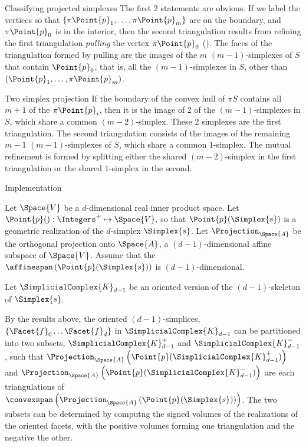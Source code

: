 \begin{plSection}{Classifying projected simplexes}
The first 2 statements are obvious.
If we label the vertices so that $\left\{\pi \Point{p}_1, \ldots , \pi \Point{p}_m\right\}$
are on the boundary, and $\pi \Point{p}_0$ is in the interior,
then the second triangulation results from refining the first
triangulation {\it pulling} the vertex $\pi \Point{p}_0$
().
The faces of the triangulation formed by pulling
are the images of the $m$ $(m-1)$-simplexes
of $S$ that contain $\Point{p}_0$, that is, all the $(m-1)$-simplexes in $S$,
other than $(\Point{p}_1, \ldots , \pi \Point{p}_m)$.

\begin{plTheorem}{Two simplex projection}{}
\label{two-simplex-case}
If the boundary of the convex hull of $\pi S$
contains all $m+1$ of the $\pi \Point{p}_i$,
then it is the image of 2 of the $(m-1)$-simplexes in $S$,
which share a common $(m-2)$-simplex.
These 2 simplexes are the first triangulation.
The second triangulation consists of the images
of the remaining $m-1$ $(m-1)$-simplexes of $S$,
which share a common $1$-simplex.
The mutual refinement is formed by splitting either
the shared $(m-2)$-simplex in the first triangulation
or the shared $1$-simplex in the second.
\end{plTheorem}

\begin{plSection}{Implementation}

Let $\Space{V}$ be a $d$-dimensional real inner product space.
Let $\Point{p}() : \Integers^{+} \mapsto \Space{V},$
so that $\Point{p}(\Simplex{s})$ is a geometric realization 
of the $d$-simplex $\Simplex{s}$.
Let $\Projection_{\Space{A}}$ be the orthogonal projection onto
$\Space{A}$, a $(d-1)$-dimensional affine subspace of $\Space{V}$.
Assume that the $\affinespan \left( \Point{p}(\Simplex{s}) \right)$
is $(d-1)$-dimensional.

Let $\SimplicialComplex{K}_{d-1}$ be an oriented version of the $(d-1)$-skeleton of $\Simplex{s}$.

By the results above, the oriented $(d-1)$-simplices,
$\left\{ \Facet{f}_0 \ldots \Facet{f}_d \right\}$ in $\SimplicialComplex{K}_{d-1}$
can be partitioned into two subsets, $\SimplicialComplex{K}_{d-1}^{+}$
and $\SimplicialComplex{K}_{d-1}^{-}$, such that
$\Projection_{\Space{A}} \left( \Point{p} ( \SimplicialComplex{K}_{d-1}^{+} ) \right)$
and
$\Projection_{\Space{A}} \left( \Point{p} ( \SimplicialComplex{K}_{d-1}^{-} ) \right)$
are each triangulations of
$\convexspan \left( \Projection_{\Space{A}} \left( \Point{p} ( \Simplex{s} ) \right) \right)$.
The two subsets can be determined by computng the signed
volumes of the realizations of the oriented facets,
with the positive volumes forming one triangulation and the negative the other.


\end{plSection}
\end{plSection}
